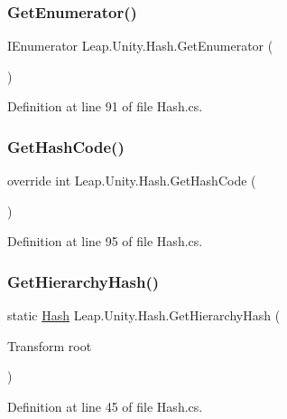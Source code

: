 \subsubsection{\texorpdfstring{GetEnumerator()}{GetEnumerator()}}
{\footnotesize\ttfamily I\+Enumerator Leap.\+Unity.\+Hash.\+Get\+Enumerator (\begin{DoxyParamCaption}{ }\end{DoxyParamCaption})}



Definition at line 91 of file Hash.\+cs.

\mbox{\label{struct_leap_1_1_unity_1_1_hash_aefa4c7403803016313cd689201ee35e1}} 
\subsubsection{\texorpdfstring{GetHashCode()}{GetHashCode()}}
{\footnotesize\ttfamily override int Leap.\+Unity.\+Hash.\+Get\+Hash\+Code (\begin{DoxyParamCaption}{ }\end{DoxyParamCaption})}



Definition at line 95 of file Hash.\+cs.

\mbox{\label{struct_leap_1_1_unity_1_1_hash_a02e356e1c90fafe7904d699cb197552d}} 
\subsubsection{\texorpdfstring{GetHierarchyHash()}{GetHierarchyHash()}}
{\footnotesize\ttfamily static \mbox{\hyperlink{struct_leap_1_1_unity_1_1_hash}{Hash}} Leap.\+Unity.\+Hash.\+Get\+Hierarchy\+Hash (\begin{DoxyParamCaption}\item[{Transform}]{root }\end{DoxyParamCaption})\hspace{0.3cm}{\ttfamily [static]}}



Definition at line 45 of file Hash.\+cs.


